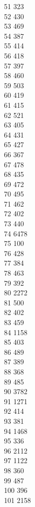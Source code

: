 { 51	323 \\
 52	430 \\
 53	469 \\
 54	387 \\
 55	414 \\
 56	418 \\
 57	397 \\
 58	460 \\
 59	503 \\
 60	419 \\
 61	415 \\
 62	521 \\
 63	405 \\
 64	431 \\
 65	427 \\
 66	367 \\
 67	478 \\
 68	435 \\
 69	472 \\
 70	495 \\
 71	462 \\
 72	402 \\
 73	440 \\
 74	6478 \\
 75	100 \\
 76	428 \\
 77	384 \\
 78	463 \\
 79	392 \\
 80	2272 \\
 81	500 \\
 82	402 \\
 83	459 \\
 84	1158 \\
 85	403 \\
 86	489 \\
 87	389 \\
 88	368 \\
 89	485 \\
 90	3782 \\
 91	1271 \\
 92	414 \\
 93	381 \\
 94	1468 \\
 95	336 \\
 96	2112 \\
 97	1122 \\
 98	360 \\
 99	487 \\
 100	396 \\
 101	2158 \\
}
